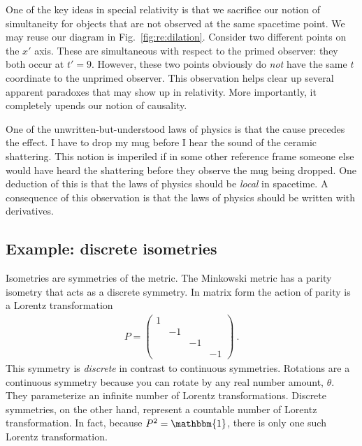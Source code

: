 \documentclass[12pt, oneside]{report}    %
\begin{document}
\begin{subappendices}
One of the key ideas in special relativity is that we sacrifice our notion of simultaneity for objects that are not observed at the same spacetime point. We may reuse our diagram in Fig.~\ref{fig:re:dilation}. Consider two different points on the $x'$ axis. These are simultaneous with respect to the primed observer: they both occur at $t'=9$. However, these two points  obviously do \emph{not} have the same $t$ coordinate to the unprimed observer. This observation helps clear up several apparent paradoxes that may show up in relativity. More importantly, it completely upends our notion of causality.

One of the unwritten-but-understood laws of physics is that the cause precedes the effect. I have to drop my mug before I hear the sound of the ceramic shattering. This notion is imperiled if in some other reference frame someone else would have heard the shattering before they observe the mug being dropped. One deduction of this is that the laws of physics should be \emph{local} in spacetime. A consequence of this observation is that the laws of physics should be written with derivatives.


\subsection{Example: discrete isometries}

Isometries are symmetries of the metric.
% 
The Minkowski metric has a parity isometry that acts as a discrete symmetry. In matrix form the action of parity is a Lorentz transformation
\begin{align}
    P = \begin{pmatrix}
        1 & & &\\
         & -1& &\\
         & & -1 &\\
         & & & -1
    \end{pmatrix}\ .
\end{align}
This symmetry is \emph{discrete} in contrast to continuous symmetries. Rotations are a continuous symmetry because you can rotate by any real number amount, $\theta$. They parameterize an infinite number of Lorentz transformations. Discrete symmetries, on the other hand, represent a countable number of Lorentz transformation. In fact, because $P^2 = \mathbbm{1}$, there is only one such Lorentz transformation. 


\end{subappendices}
\end{document}
